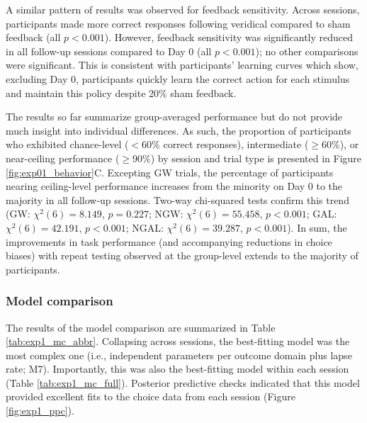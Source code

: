\documentclass[a4paper,12pt]{article}
\begin{document}
\begin{refsection}[main]
A similar pattern of results was observed for feedback sensitivity. Across sessions, participants made more correct responses following veridical compared to sham feedback (all $p < 0.001$). However, feedback sensitivity was significantly reduced in all follow-up sessions compared to Day 0 (all $p < 0.001$); no other comparisons were significant. This is consistent with participants' learning curves which show, excluding Day 0, participants quickly learn the correct action for each stimulus and maintain this policy despite 20\% sham feedback.

The results so far summarize group-averaged performance but do not provide much insight into individual differences. As such, the proportion of participants who exhibited chance-level ($<$60\% correct responses), intermediate ($\geq$60\%), or near-ceiling performance ($\geq$90\%) by session and trial type is presented in Figure \ref{fig:exp01_behavior}C. Excepting GW trials, the percentage of participants nearing ceiling-level performance increases from the minority on Day 0 to the majority in all follow-up sessions. Two-way chi-squared tests confirm this trend (GW: $\chi^2 (6) = 8.149$, $p = 0.227$; NGW: $\chi^2 (6) = 55.458$, $p < 0.001$; GAL: $\chi^2 (6) = 42.191$, $p < 0.001$; NGAL: $\chi^2 (6) = 39.287$, $p < 0.001$). In sum, the improvements in task performance (and accompanying reductions in choice biases) with repeat testing observed at the group-level extends to the majority of participants. 

\subsubsection*{Model comparison}

The results of the model comparison are summarized in Table \ref{tab:exp1_mc_abbr}. Collapsing across sessions, the best-fitting model was the most complex one (i.e., independent parameters per outcome domain plus lapse rate; M7). Importantly, this was also the best-fitting model within each session (Table \ref{tab:exp1_mc_full}). Posterior predictive checks indicated that this model provided excellent fits to the choice data from each session (Figure \ref{fig:exp1_ppc}). 


\end{refsection}
\end{document}
